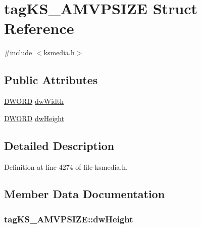 \hypertarget{structtag_k_s___a_m_v_p_s_i_z_e}{}\section{tag\+K\+S\+\_\+\+A\+M\+V\+P\+S\+I\+ZE Struct Reference}
\label{structtag_k_s___a_m_v_p_s_i_z_e}


{\ttfamily \#include $<$ksmedia.\+h$>$}

\subsection*{Public Attributes}
\begin{DoxyCompactItemize}
\item 
\hyperlink{mapinls_8h_ad342ac907eb044443153a22f964bf0af}{D\+W\+O\+RD} \hyperlink{structtag_k_s___a_m_v_p_s_i_z_e_afdbfd651508c0a88fa0ac99ef64a2546}{dw\+Width}
\item 
\hyperlink{mapinls_8h_ad342ac907eb044443153a22f964bf0af}{D\+W\+O\+RD} \hyperlink{structtag_k_s___a_m_v_p_s_i_z_e_aed8e768782c3ef66c80016651884cd61}{dw\+Height}
\end{DoxyCompactItemize}


\subsection{Detailed Description}


Definition at line 4274 of file ksmedia.\+h.



\subsection{Member Data Documentation}
\subsubsection[{\texorpdfstring{dw\+Height}{dwHeight}}]{ tag\+K\+S\+\_\+\+A\+M\+V\+P\+S\+I\+Z\+E\+::dw\+Height}\hypertarget{structtag_k_s___a_m_v_p_s_i_z_e_aed8e768782c3ef66c80016651884cd61}{}\label{structtag_k_s___a_m_v_p_s_i_z_e_aed8e768782c3ef66c80016651884cd61}


